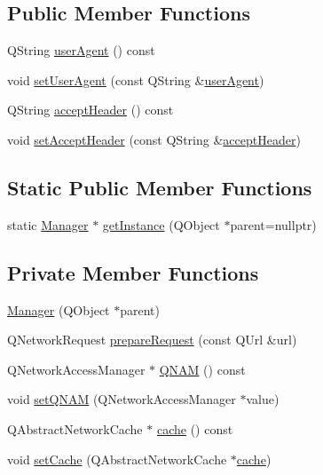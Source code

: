 \subsection*{Public Member Functions}
\begin{DoxyCompactItemize}
\item 
Q\+String \mbox{\hyperlink{classNetwork_1_1Manager_aa4f7e5630c9c95932146f0f97eb38ca1}{user\+Agent}} () const
\item 
void \mbox{\hyperlink{classNetwork_1_1Manager_acb21aaf997144be186e7e07043cd04ba}{set\+User\+Agent}} (const Q\+String \&\mbox{\hyperlink{classNetwork_1_1Manager_aa4f7e5630c9c95932146f0f97eb38ca1}{user\+Agent}})
\item 
Q\+String \mbox{\hyperlink{classNetwork_1_1Manager_ac0db9092d325d920fff7a2d095cf506b}{accept\+Header}} () const
\item 
void \mbox{\hyperlink{classNetwork_1_1Manager_ab2c4f941034a92beae89f5657777f992}{set\+Accept\+Header}} (const Q\+String \&\mbox{\hyperlink{classNetwork_1_1Manager_ac0db9092d325d920fff7a2d095cf506b}{accept\+Header}})
\end{DoxyCompactItemize}
\subsection*{Static Public Member Functions}
\begin{DoxyCompactItemize}
\item 
static \mbox{\hyperlink{classNetwork_1_1Manager}{Manager}} $\ast$ \mbox{\hyperlink{classNetwork_1_1Manager_a68811ddc10729959c5a58b6f293f52f1}{get\+Instance}} (Q\+Object $\ast$parent=nullptr)
\end{DoxyCompactItemize}
\subsection*{Private Member Functions}
\begin{DoxyCompactItemize}
\item 
\mbox{\hyperlink{classNetwork_1_1Manager_a27a2bbafd7cc4cd15d04c4a00afaae95}{Manager}} (Q\+Object $\ast$parent)
\item 
Q\+Network\+Request \mbox{\hyperlink{classNetwork_1_1Manager_aa9c1081a6e3ec9b937c3bbb9a7f7202f}{prepare\+Request}} (const Q\+Url \&url)
\item 
Q\+Network\+Access\+Manager $\ast$ \mbox{\hyperlink{classNetwork_1_1Manager_a105b541b83fa32472b40730a885154ef}{Q\+N\+AM}} () const
\item 
void \mbox{\hyperlink{classNetwork_1_1Manager_aaf5a945f52e51e357b53cacdc7319ab2}{set\+Q\+N\+AM}} (Q\+Network\+Access\+Manager $\ast$value)
\item 
Q\+Abstract\+Network\+Cache $\ast$ \mbox{\hyperlink{classNetwork_1_1Manager_a4aea14959afca0afd4b91208033da401}{cache}} () const
\item 
void \mbox{\hyperlink{classNetwork_1_1Manager_ab73570326de530e3cdd09f6bf3f195d0}{set\+Cache}} (Q\+Abstract\+Network\+Cache $\ast$\mbox{\hyperlink{classNetwork_1_1Manager_a4aea14959afca0afd4b91208033da401}{cache}})
\end{DoxyCompactItemize}
